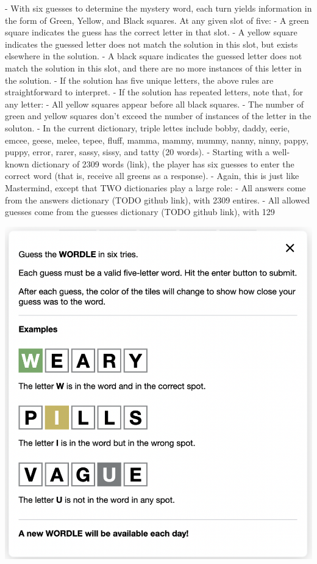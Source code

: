 \documentclass[11pt, oneside]{article}   	%
\begin{document}
  
  - With six guesses to determine the mystery word, each turn yields information in the form of Green, Yellow, and Black squares.  At any given slot of five:
     - A green square indicates the guess has the correct letter in that slot.
     - A yellow square indicates the guessed letter does not match the solution in this slot, but exists elsewhere in the solution.
     - A black square indicates the guessed letter does not match the solution in this slot, and there are no more instances of this letter in the solution.   
     - If the solution has five unique letters, the above rules are straightforward to interpret.
     - If the solution has repeated letters, note that, for any letter:
       - All yellow squares appear before all black squares.
       - The number of green and yellow squares don't exceed the number of instances of the letter in the soluton.
      - In the current dictionary, triple lettes include bobby, daddy, eerie, emcee, geese, melee, tepee, fluff, mamma, mammy, mummy, nanny, ninny, pappy, puppy, error, rarer, sassy, sissy, and tatty (20 words).
  - Starting with a well-known dictionary of 2309 words (link), the player has six guesses to enter the correct word (that is, receive all greens as a response).  
  - Again, this is just like Mastermind, except that TWO dictionaries play a large role:
     - All answers come from the answers dictionary (TODO github link), with 2309 entires.
     - All allowed guesses come from the guesses dictionary (TODO github link), with 129
     
\includegraphics[scale=.5]{rules}
\end{document}
